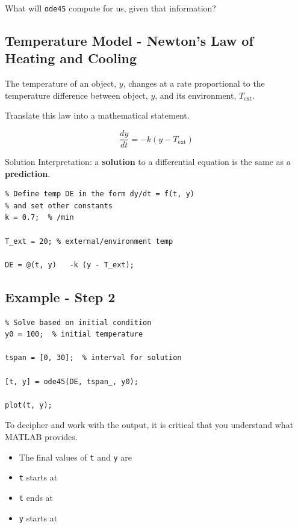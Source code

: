 \problem What will \verb#ode45# compute for us, given that
information?
\vfill
\vfill

\newpage

\subsection*{Temperature Model - Newton's Law of Heating and Cooling}

The temperature of an object, $y$, changes at a rate proportional to
the temperature difference between object, $y$, and its environment,
$T_{\mbox{ext}}$.

\problem Translate this law into a mathematical statement.

\newpage

$$\frac{dy}{dt} = -k (y - T_{\mbox{ext}})$$

Solution Interpretation: a {\bf solution} to a differential equation
is the same as a {\bf prediction}.

\begin{verbatim}
% Define temp DE in the form dy/dt = f(t, y)
% and set other constants
k = 0.7;  % /min

T_ext = 20; % external/environment temp

DE = @(t, y)   -k (y - T_ext);

\end{verbatim}

\newpage

\subsection*{Example - Step 2}
\begin{verbatim}
% Solve based on initial condition
y0 = 100;  % initial temperature

tspan = [0, 30];  % interval for solution

[t, y] = ode45(DE, tspan_, y0);

plot(t, y);
\end{verbatim}

\newpage

To decipher and work with the output, it is critical that you
understand what MATLAB provides.  
\begin{itemize}
\item The final values of \verb#t# and \verb#y# are 
\vfill
\item \verb#t# starts at
\vfill
\item \verb#t# ends at
\vfill
\item \verb#y# starts at
\vfill
\end{itemize}

